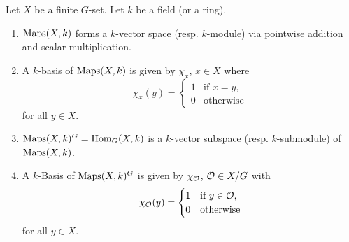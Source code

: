 \begin{lem}\label{lem: basis of Maps and Hom}
 Let $X$ be a finite $G$-set. Let $k$ be a field (or a ring).
 \begin{enumerate}[label=\emph{\alph*)},leftmargin=*]
  \item
   $\operatorname{Maps}(X,k)$ forms a $k$-vector space (resp. $k$-module) via pointwise addition and scalar multiplication.
  \item
   A $k$-basis of $\operatorname{Maps}(X,k)$ is given by $\chi_x$, $x \in X$ where
   \[
    \chi_x(y) =
    \begin{cases}
     1 & \text{if } x=y, \\
     0 & \text{otherwise}
    \end{cases}
   \]
   for all $y \in X$.
  \item
   $\operatorname{Maps}(X,k)^G = \operatorname{Hom}_G(X,k)$ is a $k$-vector subspace (resp. $k$-submodule) of $\operatorname{Maps}(X,k)$.
  \item
   A $k$-Basis of $\operatorname{Maps}(X,k)^G$ is given by $\chi_\mathcal{O}$, $\mathcal{O} \in X/G$ with
   \[
    \chi_\mathcal{O}(y) =
    \begin{cases}
     1 & \text{if } y \in \mathcal{O}, \\
     0 & \text{otherwise}
    \end{cases}
   \]
   for all $y \in X$.
 \end{enumerate}
\end{lem}
